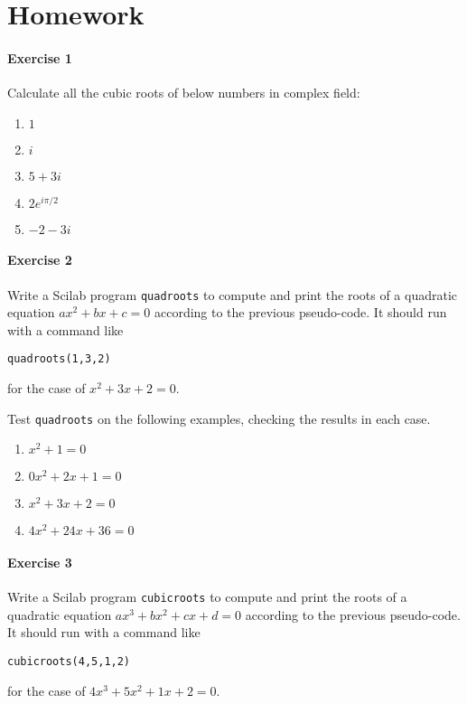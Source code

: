 \documentclass[a4paper]{book}
\begin{document}
\section{Homework}
\paragraph{Exercise 1}
Calculate all the cubic roots of below numbers in complex field:
\begin{enumerate}
\item $1$
\item $i$
\item $5+3i$
\item $2 e ^{i\pi/2}$
\item $-2-3i$
\end{enumerate}


\paragraph{Exercise 2}
Write a Scilab program {\tt quadroots} to compute and print the roots of a quadratic equation $a x^2+ b x + c = 0$ according to  the previous pseudo-code.
It should run with a command like
\begin{center}
{\tt quadroots(1,3,2)}
\end{center}
for the case of $x^2+ 3x + 2 = 0$.

Test {\tt quadroots} on the following examples, checking the results in each case.
\begin{enumerate}
\item $x^2+ 1 = 0$
\item $0x^2+ 2x + 1 = 0$
\item $x^2+ 3x + 2 = 0$
\item $4x^2+ 24x + 36 = 0$
\end{enumerate}


\paragraph{Exercise 3}
Write a Scilab program {\tt cubicroots} to compute and print the roots of a quadratic equation $ax^3+ bx^2 + cx +d = 0$ according to  the previous pseudo-code.
It should run with a command like
\begin{center}
{\tt cubicroots(4,5,1,2)}
\end{center}
for the case of $4x^3+5x^2+ 1x + 2 = 0$.
\end{document}
